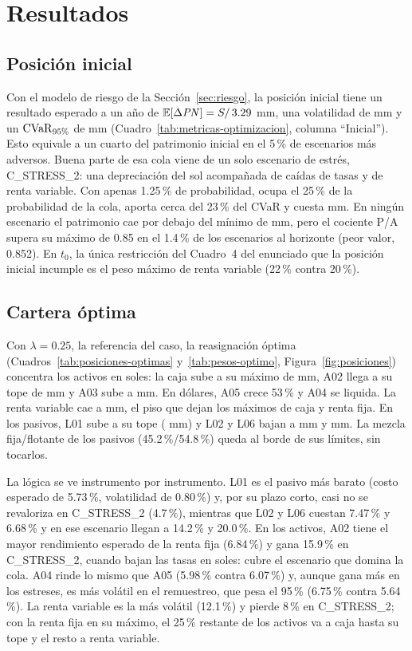 \section{Resultados}\label{sec:resultados}

\subsection{Posición inicial}
Con el modelo de riesgo de la Sección~\ref{sec:riesgo}, la posición inicial tiene un resultado esperado a
un año de $\mathbb{E}[\Delta \mathit{PN}] = S/\,3.29$ mm, una volatilidad de  mm y un $\operatorname{CVaR}_{95\%}$ de
 mm (Cuadro~\ref{tab:metricas-optimizacion}, columna ``Inicial''). Esto equivale a un cuarto del
patrimonio inicial en el 5\,\% de escenarios más adversos. Buena parte de esa cola viene de un solo
escenario de estrés, C\_STRESS\_2: una depreciación del sol acompañada de caídas de tasas y de renta
variable. Con apenas 1.25\,\% de probabilidad, ocupa el 25\,\% de la probabilidad de la cola, aporta cerca
del 23\,\% del CVaR y cuesta  mm. En ningún escenario el patrimonio cae por debajo del mínimo de
 mm, pero el cociente P/A supera su máximo de 0.85 en el 1.4\,\% de los escenarios al horizonte (peor
valor, 0.852). En $t_0$, la única restricción del Cuadro~4 del enunciado que la posición inicial incumple es
el peso máximo de renta variable (22\,\% contra 20\,\%).

\subsection{Cartera óptima}
Con $\lambda = 0.25$, la referencia del caso, la reasignación óptima (Cuadros~\ref{tab:posiciones-optimas}
y~\ref{tab:pesos-optimo}, Figura~\ref{fig:posiciones}) concentra los activos en soles: la caja sube a su
máximo de  mm, A02 llega a su tope de  mm y A03 sube a  mm. En dólares, A05 crece
53\,\% y A04 se liquida. La renta variable cae a  mm, el piso que dejan los máximos de caja y renta
fija. En los pasivos, L01 sube a su tope ( mm) y L02 y L06 bajan a  mm y  mm. La
mezcla fija/flotante de los pasivos (45.2\,\%/54.8\,\%) queda al borde de sus límites, sin tocarlos.

La lógica se ve instrumento por instrumento. L01 es el pasivo más barato (costo esperado de 5.73\,\%,
volatilidad de 0.80\,\%) y, por su plazo corto, casi no se revaloriza en C\_STRESS\_2 (4.7\,\%), mientras
que L02 y L06 cuestan 7.47\,\% y 6.68\,\% y en ese escenario llegan a 14.2\,\% y 20.0\,\%. En los activos,
A02 tiene el mayor rendimiento esperado de la renta fija (6.84\,\%) y gana 15.9\,\% en C\_STRESS\_2, cuando
bajan las tasas en soles: cubre el escenario que domina la cola. A04 rinde lo mismo que A05 (5.98\,\% contra
6.07\,\%) y, aunque gana más en los estreses, es más volátil en el remuestreo, que pesa el 95\,\% (6.75\,\%
contra 5.64\,\%). La renta variable es la más volátil (12.1\,\%) y pierde 8\,\% en C\_STRESS\_2; con la renta
fija en su máximo, el 25\,\% restante de los activos va a caja hasta su tope y el resto a renta variable.

